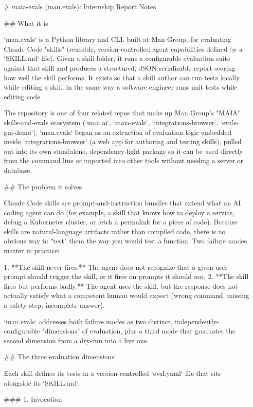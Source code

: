 # maia-evals (man.evals): Internship Report Notes

## What it is

`man.evals` is a Python library and CLI, built at Man Group, for evaluating Claude Code "skills" (reusable, version-controlled agent capabilities defined by a `SKILL.md` file).
Given a skill folder, it runs a configurable evaluation suite against that skill and produces a structured, JSON-serializable report scoring how well the skill performs.
It exists so that a skill author can run tests locally while editing a skill, in the same way a software engineer runs unit tests while editing code.

The repository is one of four related repos that make up Man Group's "MAIA" skills-and-evals ecosystem (`man.ai`, `maia-evals`, `integrations-browser`, `evals-gui-demo`).
`man.evals` began as an extraction of evaluation logic embedded inside `integrations-browser` (a web app for authoring and testing skills), pulled out into its own standalone, dependency-light package so it can be used directly from the command line or imported into other tools without needing a server or database.

## The problem it solves

Claude Code skills are prompt-and-instruction bundles that extend what an AI coding agent can do (for example, a skill that knows how to deploy a service, debug a Kubernetes cluster, or fetch a permalink for a piece of code).
Because skills are natural-language artifacts rather than compiled code, there is no obvious way to "test" them the way you would test a function.
Two failure modes matter in practice:

1. **The skill never fires.** The agent does not recognize that a given user prompt should trigger the skill, or it fires on prompts it should not.
2. **The skill fires but performs badly.** The agent uses the skill, but the response does not actually satisfy what a competent human would expect (wrong command, missing a safety step, incomplete answer).

`man.evals` addresses both failure modes as two distinct, independently-configurable "dimensions" of evaluation, plus a third mode that graduates the second dimension from a dry-run into a live one.

## The three evaluation dimensions

Each skill defines its tests in a version-controlled `eval.yaml` file that sits alongside its `SKILL.md`.

### 1. Invocation


